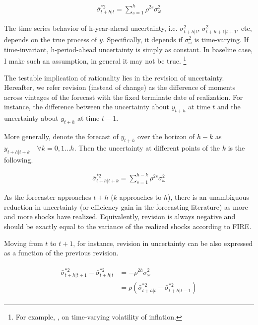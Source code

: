 \documentclass[12pt]{article}
\begin{document}
	\begin{eqnarray}\label{VarREIndPop}
		\bar \sigma^{*2}_{t+h|t} = \sum^{h}_{s=1}\rho^{2s} \sigma^2_{\omega}
	\end{eqnarray}
	
	The time series behavior of h-year-ahead uncertainty, i.e. $\sigma^2_{t+h|t}$, $\sigma^2_{t+h+1|t+1}$, etc, depends on the true process of $y$. Specifically, it depends if $\sigma^2_\omega$ is time-varying. If time-invariant, h-period-ahead uncertainty is simply as constant. In baseline case, I make such an assumption, in general it may not be true. \footnote{For example, \citet{justiniano2008time}, \citet{vavra2013inflation} on time-varying volatility of inflation.} 
	
	The testable implication of rationality lies in the revision of uncertainty. Hereafter, we refer revision (instead of change) as the difference of moments across vintages of the forecast with the fixed terminate date of realization. For instance, the difference between the uncertainty about $y_{t+h}$ at time $t$ and the uncertainty about $y_{t+h}$ at time $t-1$.
	
	
	
	More generally,  denote the forecast of $y_{t+h}$ over the horizon of $h-k$ as $y_{t+h|t+k} \quad \forall k =0,1...h$. Then the uncertainty at different points of the $k$ is the following. 
	
	\begin{eqnarray}\label{VarREPop}
		\bar \sigma^{*2}_{t+h|t+k} = \sum^{h-k}_{s=1}\rho^{2s} \sigma^2_{\omega}
	\end{eqnarray}
	
	As the forecaster approaches $t+h$ ($k$ approaches to $h$), there is an unambiguous reduction in uncertainty (or efficiency gain in the forecasting literature) as more and more shocks have realized. Equivalently, revision is always negative and should be exactly equal to the variance of the realized shocks according to FIRE. 
	
	Moving from $t$ to $t+1$, for instance, revision in uncertainty can be also expressed as a function of the previous revision.  
	
	\begin{eqnarray}\label{VarREPopRv}
		\begin{aligned}
			\bar \sigma^{*2}_{t+h|t+1} - \bar \sigma^{*2}_{t+h|t} & = - \rho^{2h}\sigma^2_\omega \\
			& =  \rho (\bar \sigma^{*2}_{t+h|t} - \bar \sigma^{*2}_{t+h|t-1})
		\end{aligned}
	\end{eqnarray}
	
\end{document}

